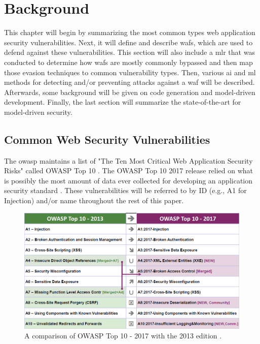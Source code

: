 \chapter{Background}
This chapter will begin by summarizing the most common types web application security vulnerabilities. Next, it will define and describe \acrfull{waf}s, which are used to defend against these vulnerabilities. This section will also include a \acrfull{mlr} that was conducted to determine how \acrshort{waf}s are mostly commonly bypassed and then map those evasion techniques to common vulnerability types. Then, various \acrfull{ai} and \acrfull{ml} methods for detecting and/or preventing attacks against a \acrshort{waf} will be described. Afterwards, some background will be given on code generation and model-driven development. Finally, the last section will summarize the state-of-the-art for model-driven security.

\section{Common Web Security Vulnerabilities}
The \acrfull{owasp} maintains a list of "The Ten Most Critical Web Application Security Risks" called OWASP Top 10 \cite{owasp2017top}. The OWASP Top 10 2017 release relied on what is possibly the most amount of data ever collected for developing an application security standard \cite{owasp2017top}. These vulnerabilities will be referred to by ID (e.g., A1 for Injection) and/or name throughout the rest of this paper.

\begin{figure}[htbp]  %
  \centering
  \includegraphics[width=.55\textwidth]{figures/owasp_2013_2017.png}
  \caption[OWASP Top 10]{A comparison of OWASP Top 10 - 2017 with the 2013 edition \cite{owasp2017top}.}
  \label{fig:owasp_2013_2017}
\end{figure}


